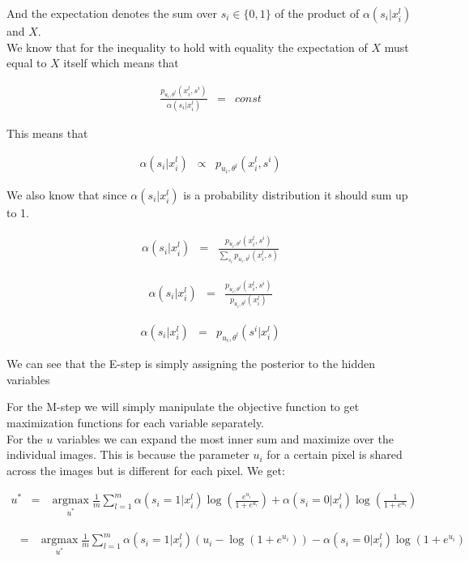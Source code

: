 \documentclass[11pt]{article}
\DeclareMathOperator*{\argmax}{argmax}
\begin{document}
And the expectation denotes the sum over $s_i \in\{0,1\}$ of the product of $\alpha(s_i | x_i^l)$ and $X$. \\ 
We know that for the inequality to hold with equality the expectation of $X$ must equal to $X$ itself which 
means that 

\begin{eqnarray} 
\frac{ p_{u_i,\theta^l}(x_i^l,s^i)}{\alpha(s_i | x_i^l)} &=& const
\end{eqnarray}

This means that 

\begin{eqnarray}
\alpha(s_i | x_i^l) &\propto& p_{u_i,\theta^l}(x_i^l,s^i)
\end{eqnarray}

We also know that since $\alpha(s_i | x_i^l)$ is a probability distribution it should sum up to 1.

\begin{eqnarray}
\alpha(s_i | x_i^l) &=& \frac{ p_{u_i,\theta^l}(x_i^l,s^i)}{\sum_{s_i} p_{u_i,\theta^l}(x_i^l,s)}  
\end{eqnarray}

\begin{eqnarray}
\alpha(s_i | x_i^l) &=& \frac{ p_{u_i,\theta^l}(x_i^l,s^i)}{p_{u_i,\theta^l}(x_i^l)}  
\end{eqnarray}

\begin{eqnarray}
\alpha(s_i | x_i^l) &=& p_{u_i,\theta^l}(s^i | x_i^l)
\end{eqnarray}

We can see that the E-step is simply assigning the posterior to the hidden variables

For the M-step we will simply manipulate the objective function to get maximization functions for each variable separately. \\ 
For the $u$ variables we can expand the most inner sum and maximize over the individual images. This is because the parameter $u_i$ for a certain pixel is shared across the images but is different for each pixel. We get:

\begin{eqnarray}
u^* &=& \argmax\limits_{u^*} \frac{1}{m}\sum_{l=1}^m \alpha(s_i = 1 | x_i^l) \log (\frac{e^{u_i}}{1 + e^{u_i}}) + \alpha(s_i = 0 | x_i^l) \log (\frac{1}{1 + e^{u_i}})
\end{eqnarray}

\begin{eqnarray}
 &=& \argmax\limits_{u^*} \frac{1}{m}\sum_{l=1}^m \alpha(s_i = 1 | x_i^l)(u_i - \log (1 + e^{u_i})) - \alpha(s_i = 0 | x_i^l) \log (1 + e^{u_i})
\end{eqnarray}
\end{document}
